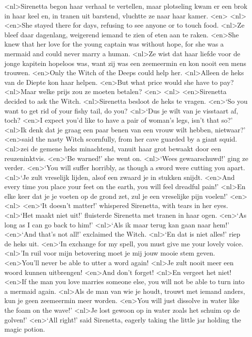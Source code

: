 <nl>Sirenetta begon haar verhaal te vertellen, maar plotseling kwam er een brok in haar keel en, in tranen uit barstend, vluchtte ze naar haar kamer.
<en>
<nl>
<en>She stayed there for days, refusing to see anyone or to touch food.
<nl>Ze bleef daar dagenlang, weigerend iemand te zien of eten aan te raken.
<en>She knew that her love for the young captain was without hope, for she was a mermaid and could never marry a human.
<nl>Ze wist dat haar liefde voor de jonge kapitein hopeloos was, want zij was een zeemeermin en kon nooit een mens trouwen.
<en>Only the Witch of the Deeps could help her.
<nl>Alleen de heks van de Diepte kon haar helpen.
<en>But what price would she have to pay?
<nl>Maar welke prijs zou ze moeten betalen?
<en>
<nl>
<en>Sirenetta decided to ask the Witch.
<nl>Sirenetta besloot de heks te vragen.
<en>`So you want to get rid of your fishy tail, do you?
<nl>`Dus je wilt van je visstaart af, toch?
<en>I expect you’d like to have a pair of woman’s legs, isn’t that so?'
<nl>Ik denk dat je graag een paar benen van een vrouw wilt hebben, nietwaar?'
<en>said the nasty Witch scornfully, from her cave guarded by a giant squid.
<nl>zei de gemene heks minachtend, vanuit haar grot bewaakt door een reuzeninktvis.
<en>`Be warned!' she went on.
<nl>`Wees gewaarschuwd!' ging ze verder.
<en>`You will suffer horribly, as though a sword were cutting you apart.
<nl>`Je zult vreselijk lijden, alsof een zwaard je in stukken snijdt.
<en>And every time you place your feet on the earth, you will feel dreadful pain!'
<nl>En elke keer dat je je voeten op de grond zet, zul je een vreselijke pijn voelen!'
<en>
<nl>
<en>`It doesn’t matter!' whispered Sirenetta, with tears in her eyes.
<nl>`Het maakt niet uit!' fluisterde Sirenetta met tranen in haar ogen.
<en>`As long as I can go back to him!'
<nl>`Als ik maar terug kan gaan naar hem!'
<en>`And that’s not all!' exclaimed the Witch.
<nl>`En dat is niet alles!' riep de heks uit.
<en>`In exchange for my spell, you must give me your lovely voice.
<nl>'In ruil voor mijn betovering moet je mij jouw mooie stem geven.
<en>You’ll never be able to utter a word again!
<nl>Je zult nooit meer een woord kunnen uitbrengen!
<en>And don’t forget!
<nl>En vergeet het niet!
<en>If the man you love marries someone else, you will not be able to turn into a mermaid again.
<nl>Als de man van wie je houdt, trouwt met iemand anders, kun je geen zeemeermin meer worden.
<en>You will just dissolve in water like the foam on the wave!'
<nl>Je lost gewoon op in water zoals het schuim op de golven!'
<en>`All right!' said Sirenetta, eagerly taking the little jar holding the magic potion.
